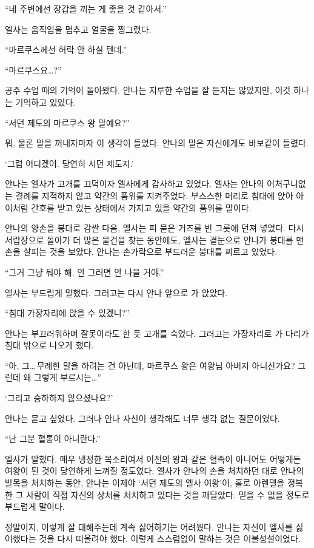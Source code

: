 ``네 주변에선 장갑을 끼는 게 좋을 것 같아서.''

엘사는 움직임을 멈추고 얼굴을 찡그렸다.

``마르쿠스께선 허락 안 하실 텐데.''

``마르쿠스요\ldots?''

공주 수업 때의 기억이 돌아왔다. 안나는 지루한 수업을 잘 듣지는 않았지만, 이것 하나는 기억하고 있었다.

``서던 제도의 마르쿠스 왕 말예요?''

뭐, 물론 말을 꺼내자마자 이 생각이 들었다. 안나의 말은 자신에게도 바보같이 들렸다.

`그럼 어디겠어. 당연히 서던 제도지.'

안나는 엘사가 고개를 끄덕이자 엘사에게 감사하고 있었다. 엘사는 안나의 어처구니없는 결례를 지적하지 않고 약간의 품위를 지켜주었다. 부스스한 머리로 침대에 앉아 아이처럼 간호를 받고 있는 상태에서 가지고 있을 약간의 품위를 말이다.

안나의 양손을 붕대로 감싼 다음, 엘사는 피 묻은 거즈를 빈 그릇에 던져 넣었다. 다시 서랍장으로 돌아가 더 많은 물건을 찾는 동안에도, 엘사는 곁눈으로 안나가 붕대를 맨 손을 살피는 것을 보았다. 안나는 손가락으로 부드러운 붕대를 찌르고 있었다.

``그거 그냥 둬야 해. 안 그러면 안 나을 거야.''

엘사는 부드럽게 말했다. 그러고는 다시 안나 앞으로 가 앉았다.

``침대 가장자리에 앉을 수 있겠니?''

안나는 부끄러워하며 잘못이라도 한 듯 고개를 숙였다. 그러고는 가장자리로 가 다리가 침대 밖으로 나오게 했다.

``아, 그\ldots\,무례한 말을 하려는 건 아닌데, 마르쿠스 왕은 여왕님 아버지 아니신가요? 그런데 왜 그렇게 부르시는\ldots''

`그리고 승하하지 않으셨나요?'

안나는 묻고 싶었다. 그러나 안나 자신이 생각해도 너무 생각 없는 질문이었다.

``난 그분 혈통이 아니란다.''

엘사가 말했다. 매우 냉정한 목소리여서 이전의 왕과 같은 혈족이 아니어도 어떻게든 여왕이 된 것이 당연하게 느껴질 정도였다. 엘사가 안나의 손을 처치하던 대로 안나의 발목을 처치하는 동안, 안나는 이제야 `서던 제도의 엘사 여왕'이, 홀로 아렌델을 정복한 그 사람이 직접 자신의 상처를 처치하고 있다는 것을 깨달았다. 믿을 수 없을 정도로 부드럽게 말이다.

정말이지, 이렇게 잘 대해주는데 계속 싫어하기는 어려웠다. 안나는 자신이 엘사를 싫어했다는 것을 다시 떠올려야 했다. 이렇게 스스럼없이 말하는 것은 어불성설이었다.

